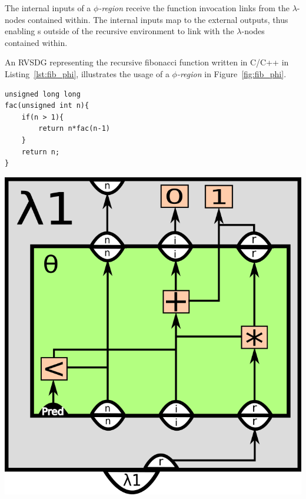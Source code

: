 \begin{itemize}
The internal inputs of a \textit{$\phi$-region} receive the function invocation links from the
$\lambda$-nodes contained within. The internal inputs map to the external
outputs, thus enabling \applyNode s outside of the recursive environment to link
with the $\lambda$-nodes contained within.


An RVSDG representing the recursive fibonacci function written in C/C++ in
Listing~\ref{lst:fib_phi}, illustrates the usage of a \textit{$\phi$-region} in
Figure~\ref{fig:fib_phi}.


\begin{centering}
	\noindent\begin{minipage}{0.37\textwidth}
		\begin{CenteredBox}
		\begin{lstlisting}[label={lst:recursive_factorial_func_ex},
style=minipage_customcpp]
unsigned long long
fac(unsigned int n){
	if(n > 1){
		return n*fac(n-1)
	}
	return n;
}
		\end{lstlisting}
		\end{CenteredBox}
	\end{minipage}
	\noindent\begin{minipage}{0.55\textwidth}
		\captionsetup{type=figure}
		\includegraphics[width=\textwidth]{figures/iterative_factorial_func_ex}
	\end{minipage}
	\label{fig:recursive_factorial_func_ex}
\end{centering}

\end{itemize}

